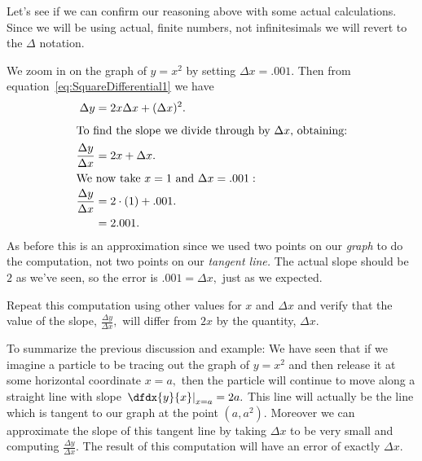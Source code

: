 
\begin{myexample}{}
  Let's see if we can confirm our reasoning above with some actual
  calculations. Since we will be using actual, finite numbers, not 
  infinitesimals we will revert to the $\Delta$ notation. 

  We zoom in on the graph of $y=x^2$ by setting $\Delta x= .001.$ Then
  from equation~\ref{eq:SquareDifferential1} we have
  \begin{align*}
    \Delta y &= 2x\Delta x + (\Delta x)^2.\\[1mm]
    \intertext{To find the slope we divide through by $\Delta x$,
    obtaining:}
    \frac{\Delta y}{\Delta x} &= 2x + \Delta x.\\
    \intertext{We now take $x=1$ and $\Delta x= .001:$}
    \frac{\Delta y}{\Delta x} &= 2\cdot(1) + .001.\\
             &= 2.001.\\
  \end{align*}
  As before this is an approximation since we used two points on our
  \emph{graph} to do the computation, not two points on our
  \emph{tangent line.} The actual slope should be $2$ as we've seen,
  so the error is $.001 = \Delta x,$ just as we expected.
\end{myexample}
\begin{embeddedproblem}{}
  Repeat this computation using other values for $x$ and $\Delta x$
  and verify that the value of the slope, $\frac{\Delta y}{\Delta x},$
  will differ from $2x$ by the quantity, $\Delta x.$
\end{embeddedproblem}



To summarize the previous discussion and example: We have seen that if
we imagine a particle to be tracing out the graph of $y=x^2$ and then
release it at some horizontal coordinate $x=a,$ then the particle will
continue to move along a straight line with slope
$\left.\dfdx{y}{x}\right|_{x=a} = 2a.$ This line will actually be the
line which is tangent to our graph at the point $(a, a^2).$ Moreover
we can approximate the slope of this tangent line by taking $\Delta x$
to be very small and computing $\frac{\Delta y}{\Delta x}.$ The result
of this computation will have an error of exactly $\Delta x.$

